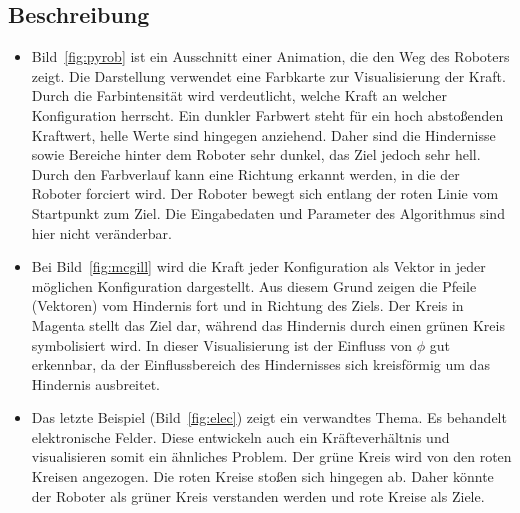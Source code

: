 \subsection{Beschreibung}
\begin{itemize}
\item Bild~\vref{fig:pyrob}  ist ein Ausschnitt einer Animation, die den Weg des Roboters zeigt. Die Darstellung verwendet eine Farbkarte zur Visualisierung der Kraft. Durch die Farbintensität wird verdeutlicht, welche Kraft an welcher Konfiguration herrscht. Ein dunkler Farbwert steht für ein hoch abstoßenden Kraftwert, helle Werte sind hingegen anziehend. Daher sind die Hindernisse sowie Bereiche hinter dem Roboter sehr dunkel, das Ziel jedoch sehr hell. Durch den Farbverlauf kann eine Richtung erkannt werden, in die der Roboter forciert wird. Der Roboter bewegt sich entlang der roten Linie vom Startpunkt zum Ziel. Die Eingabedaten und Parameter des Algorithmus sind hier nicht veränderbar.
\item Bei Bild~\vref{fig:mcgill} wird die Kraft jeder Konfiguration als Vektor in jeder möglichen Konfiguration dargestellt. Aus diesem Grund zeigen die Pfeile (Vektoren) vom Hindernis fort und in Richtung des Ziels. Der Kreis in Magenta stellt das Ziel dar, während das Hindernis durch einen grünen Kreis symbolisiert wird. In dieser Visualisierung ist der Einfluss von $\phi$ gut erkennbar, da der Einflussbereich des Hindernisses sich kreisförmig um das Hindernis ausbreitet.
\item Das letzte Beispiel (Bild~\vref{fig:elec}) zeigt ein verwandtes Thema. Es behandelt elektronische Felder. Diese entwickeln auch ein Kräfteverhältnis und visualisieren somit ein ähnliches Problem. Der grüne Kreis wird von den roten Kreisen angezogen. Die roten Kreise stoßen sich hingegen ab. Daher könnte der Roboter als grüner Kreis verstanden werden und rote Kreise als Ziele.
\end{itemize}

